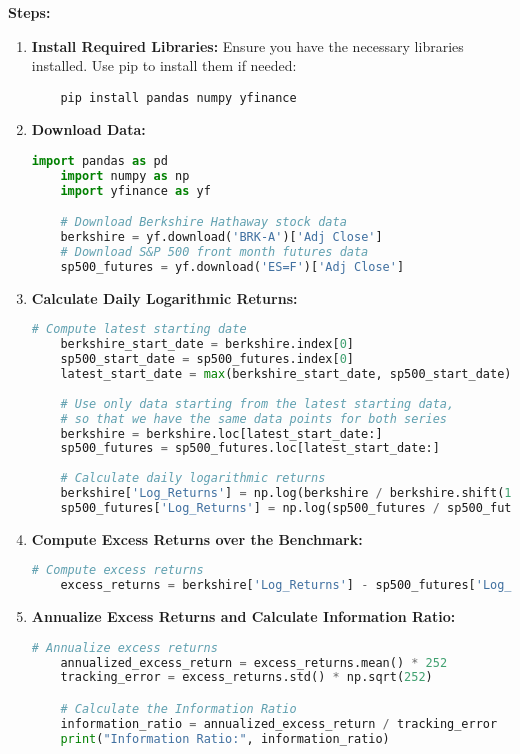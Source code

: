\documentclass{article}
\begin{document}
\textbf{Steps:}
\begin{enumerate}
    \item \textbf{Install Required Libraries:} Ensure you have the necessary libraries installed. Use pip to install them if needed:
    \begin{verbatim}
    pip install pandas numpy yfinance
    \end{verbatim}

    \item \textbf{Download Data:}
    \begin{lstlisting}[language=Python]
    import pandas as pd
    import numpy as np
    import yfinance as yf

    # Download Berkshire Hathaway stock data
    berkshire = yf.download('BRK-A')['Adj Close']
    # Download S&P 500 front month futures data
    sp500_futures = yf.download('ES=F')['Adj Close']
    \end{lstlisting}

    \item \textbf{Calculate Daily Logarithmic Returns:}
    \begin{lstlisting}[language=Python]
    # Compute latest starting date
    berkshire_start_date = berkshire.index[0]
    sp500_start_date = sp500_futures.index[0]
    latest_start_date = max(berkshire_start_date, sp500_start_date)
    
    # Use only data starting from the latest starting data, 
    # so that we have the same data points for both series
    berkshire = berkshire.loc[latest_start_date:]
    sp500_futures = sp500_futures.loc[latest_start_date:]
    
    # Calculate daily logarithmic returns
    berkshire['Log_Returns'] = np.log(berkshire / berkshire.shift(1))
    sp500_futures['Log_Returns'] = np.log(sp500_futures / sp500_futures.shift(1))
    \end{lstlisting}

    \item \textbf{Compute Excess Returns over the Benchmark:}
    \begin{lstlisting}[language=Python]
    # Compute excess returns
    excess_returns = berkshire['Log_Returns'] - sp500_futures['Log_Returns']
    \end{lstlisting}

    \item \textbf{Annualize Excess Returns and Calculate Information Ratio:}
    \begin{lstlisting}[language=Python]
    # Annualize excess returns
    annualized_excess_return = excess_returns.mean() * 252
    tracking_error = excess_returns.std() * np.sqrt(252)

    # Calculate the Information Ratio
    information_ratio = annualized_excess_return / tracking_error
    print("Information Ratio:", information_ratio)
    \end{lstlisting}
\end{enumerate}
\end{document}

